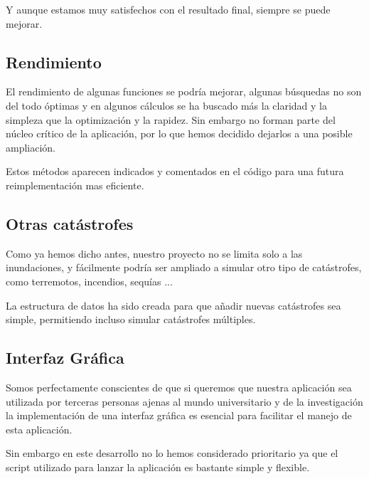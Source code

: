 Y aunque estamos muy satisfechos con el resultado final, siempre se puede
mejorar.
\subsection*{Rendimiento}
El rendimiento de algunas funciones se podría mejorar, algunas búsquedas no son
del todo óptimas y en algunos cálculos se ha buscado más la claridad y la
simpleza que la optimización y la rapidez. Sin embargo no forman parte del
núcleo crítico de la aplicación, por lo que hemos decidido dejarlos a una
posible ampliación. 

Estos métodos aparecen indicados y comentados en el código para una futura
reimplementación mas eficiente.
\subsection*{Otras catástrofes}
Como ya hemos dicho antes, nuestro proyecto no se limita solo a las
inundaciones, y fácilmente podría ser ampliado a simular otro tipo de
catástrofes, como terremotos, incendios, sequías ...

La estructura de datos ha sido creada para que añadir nuevas catástrofes sea
simple, permitiendo incluso simular catástrofes múltiples.
\subsection*{Interfaz Gráfica}
Somos perfectamente conscientes de que si queremos que nuestra aplicación sea
utilizada por terceras personas ajenas al mundo universitario y de la
investigación la implementación de una interfaz gráfica es esencial para
facilitar el manejo de esta aplicación.

Sin embargo en este desarrollo no lo hemos considerado prioritario ya que
el script utilizado para lanzar la aplicación es bastante simple y flexible.


